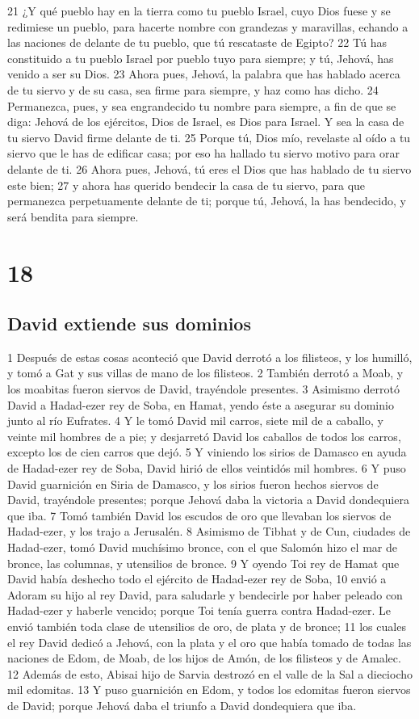 21 ¿Y qué pueblo hay en la tierra como tu pueblo Israel, cuyo Dios fuese y se redimiese un pueblo, para hacerte nombre con grandezas y maravillas, echando a las naciones de delante de tu pueblo, que tú rescataste de Egipto?
22 Tú has constituido a tu pueblo Israel por pueblo tuyo para siempre; y tú, Jehová, has venido a ser su Dios.
23 Ahora pues, Jehová, la palabra que has hablado acerca de tu siervo y de su casa, sea firme para siempre, y haz como has dicho.
24 Permanezca, pues, y sea engrandecido tu nombre para siempre, a fin de que se diga: Jehová de los ejércitos, Dios de Israel, es Dios para Israel. Y sea la casa de tu siervo David firme delante de ti.
25 Porque tú, Dios mío, revelaste al oído a tu siervo que le has de edificar casa; por eso ha hallado tu siervo motivo para orar delante de ti.
26 Ahora pues, Jehová, tú eres el Dios que has hablado de tu siervo este bien;
27 y ahora has querido bendecir la casa de tu siervo, para que permanezca perpetuamente delante de ti; porque tú, Jehová, la has bendecido, y será bendita para siempre.

\chapter{18}

\section*{David extiende sus dominios }


1 Después de estas cosas aconteció que David derrotó a los filisteos, y los humilló, y tomó a Gat y sus villas de mano de los filisteos.
2 También derrotó a Moab, y los moabitas fueron siervos de David, trayéndole presentes.
3 Asimismo derrotó David a Hadad-ezer rey de Soba, en Hamat, yendo éste a asegurar su dominio junto al río Eufrates.
4 Y le tomó David mil carros, siete mil de a caballo, y veinte mil hombres de a pie; y desjarretó David los caballos de todos los carros, excepto los de cien carros que dejó.
5 Y viniendo los sirios de Damasco en ayuda de Hadad-ezer rey de Soba, David hirió de ellos veintidós mil hombres.
6 Y puso David guarnición en Siria de Damasco, y los sirios fueron hechos siervos de David, trayéndole presentes; porque Jehová daba la victoria a David dondequiera que iba.
7 Tomó también David los escudos de oro que llevaban los siervos de Hadad-ezer, y los trajo a Jerusalén.
8 Asimismo de Tibhat y de Cun, ciudades de Hadad-ezer, tomó David muchísimo bronce, con el que Salomón hizo el mar de bronce, las columnas, y utensilios de bronce. 
9 Y oyendo Toi rey de Hamat que David había deshecho todo el ejército de Hadad-ezer rey de Soba,
10 envió a Adoram su hijo al rey David, para saludarle y bendecirle por haber peleado con Hadad-ezer y haberle vencido; porque Toi tenía guerra contra Hadad-ezer. Le envió también toda clase de utensilios de oro, de plata y de bronce;
11 los cuales el rey David dedicó a Jehová, con la plata y el oro que había tomado de todas las naciones de Edom, de Moab, de los hijos de Amón, de los filisteos y de Amalec.
12 Además de esto, Abisai hijo de Sarvia destrozó en el valle de la Sal a dieciocho mil edomitas. 
13 Y puso guarnición en Edom, y todos los edomitas fueron siervos de David; porque Jehová daba el triunfo a David dondequiera que iba.
